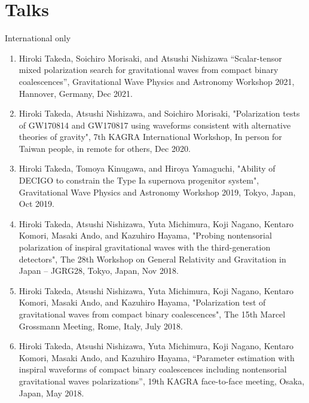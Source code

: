 \documentclass[12pt,a4paper]{article}
\begin{document}
\section*{Talks}
International only

\begin{enumerate}

\item Hiroki Takeda, Soichiro Morisaki, and Atsushi Nishizawa “Scalar-tensor mixed polarization search for gravitational waves from compact binary coalescences”, Gravitational Wave Physics and Astronomy Workshop 2021, Hannover, Germany, Dec 2021.

\item Hiroki Takeda, Atsushi Nishizawa, and Soichiro Morisaki, "Polarization tests of GW170814 and GW170817 using waveforms consistent with alternative theories of gravity", 7th KAGRA International Workshop, In person for Taiwan people, in remote for others, Dec 2020.

\item Hiroki Takeda, Tomoya Kinugawa, and Hiroya Yamaguchi, "Ability of DECIGO to constrain the Type Ia supernova progenitor system", Gravitational Wave Physics and Astronomy Workshop 2019, Tokyo, Japan, Oct 2019.

\item Hiroki Takeda, Atsushi Nishizawa, Yuta Michimura, Koji Nagano, Kentaro Komori, Masaki Ando, and Kazuhiro Hayama, "Probing nontensorial polarization of inspiral gravitational waves with the third-generation detectors", The 28th Workshop on General Relativity and Gravitation in Japan – JGRG28, Tokyo, Japan, Nov 2018.

\item Hiroki Takeda, Atsushi Nishizawa, Yuta Michimura, Koji Nagano, Kentaro Komori, Masaki Ando, and Kazuhiro Hayama, "Polarization test of gravitational waves from compact binary coalescences", The 15th Marcel Grossmann Meeting, Rome, Italy, July 2018.

\item Hiroki Takeda, Atsushi Nishizawa, Yuta Michimura, Koji Nagano, Kentaro Komori, Masaki Ando, and Kazuhiro Hayama, “Parameter estimation with inspiral waveforms of compact binary coalescences including nontensorial gravitational waves polarizations”, 19th KAGRA face-to-face meeting, Osaka, Japan, May 2018.

\end{enumerate}
\end{document}
